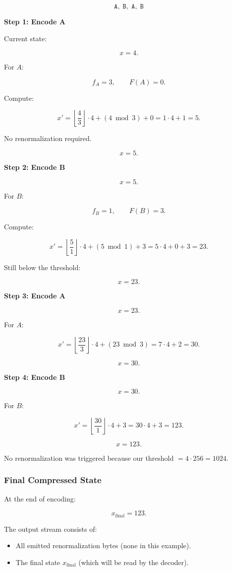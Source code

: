 \[
\texttt{A},\; \texttt{B},\; \texttt{A},\; \texttt{B}
\]

\textbf{Step 1: Encode A}

Current state:

\[
x = 4.
\]

For $A$:

\[
f_A = 3,\qquad F(A)=0.
\]

Compute:

\[
x' = \left\lfloor \frac{4}{3} \right\rfloor \cdot 4 + (4 \bmod 3) + 0
    = 1 \cdot 4 + 1 = 5.
\]

No renormalization required.

\[
x = 5.
\]

\textbf{Step 2: Encode B}

\[
x = 5.
\]

For $B$:

\[
f_B = 1,\qquad F(B)=3.
\]

Compute:

\[
x' = \left\lfloor \frac{5}{1} \right\rfloor \cdot 4 + (5 \bmod 1) + 3
    = 5 \cdot 4 + 0 + 3 = 23.
\]

Still below the threshold:

\[
x = 23.
\]

\textbf{Step 3: Encode A}

\[
x = 23.
\]

For $A$:

\[
x' = \left\lfloor \frac{23}{3} \right\rfloor \cdot 4 + (23 \bmod 3)
    = 7 \cdot 4 + 2 = 30.
\]

\[
x = 30.
\]

\textbf{Step 4: Encode B}

\[
x = 30.
\]

For $B$:

\[
x' = \left\lfloor \frac{30}{1} \right\rfloor \cdot 4 + 3 = 30 \cdot 4 + 3 = 123.
\]

\[
x = 123.
\]

No renormalization was triggered because our threshold $=4\cdot256=1024$.

\subsubsection{Final Compressed State}

At the end of encoding:

\[
x_{\text{final}} = 123.
\]

The output stream consists of:

\begin{itemize}
    \item All emitted renormalization bytes (none in this example).
    \item The final state $x_{\text{final}}$ (which will be read by the decoder).
\end{itemize}

